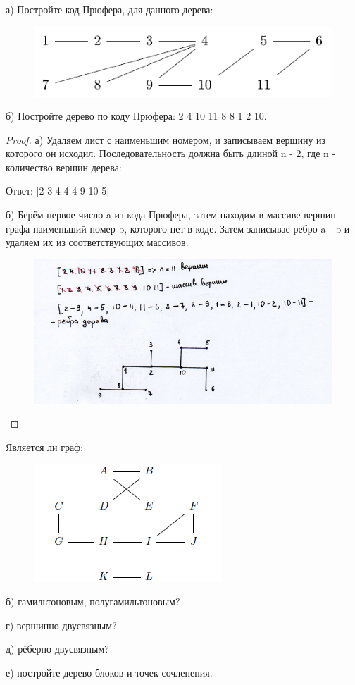 \begin{problem}[4]
	а) Постройте код Прюфера, для данного дерева:
 
    \begin{figure}[h]
     \centering
     \includegraphics[width=0.5\linewidth]{pics/4thGraph.png}
     \label{fig:dm}
    \end{figure}

    б) Постройте дерево по коду Прюфера: 2 4 10 11 8 8 1 2 10.
\end{problem}

\begin{proof}
    а) Удаляем лист с наименьшим номером, и записываем вершину из которого он исходил. Последовательность должна быть длиной n - 2, где n - количество вершин дерева:
   
    Ответ: [2 3 4 4 4 9 10 5]

    б) Берём первое число a из кода Прюфера, затем находим в массиве вершин графа наименьший номер b, которого нет в коде. Затем записывае ребро a - b и удаляем их из соответствующих массивов.

    \begin{figure}[h]
     \centering
     \includegraphics[width=0.7\linewidth]{pics/4thBsolution.png}
     \label{fig:dm}
    \end{figure}
    
\end{proof}

\begin{problem}[5]
    Является ли граф: 
    \begin{figure}[h]
    \centering
     \includegraphics[width=0.4\linewidth]{pics/Graph5th.png}
     \label{fig:dm}
    \end{figure}
    
    б) гамильтоновым, полугамильтоновым?
    
    г) вершинно-двусвязным?

    д) рёберно-двусвязным?

    е) постройте дерево блоков и точек сочленения.
\end{problem}

